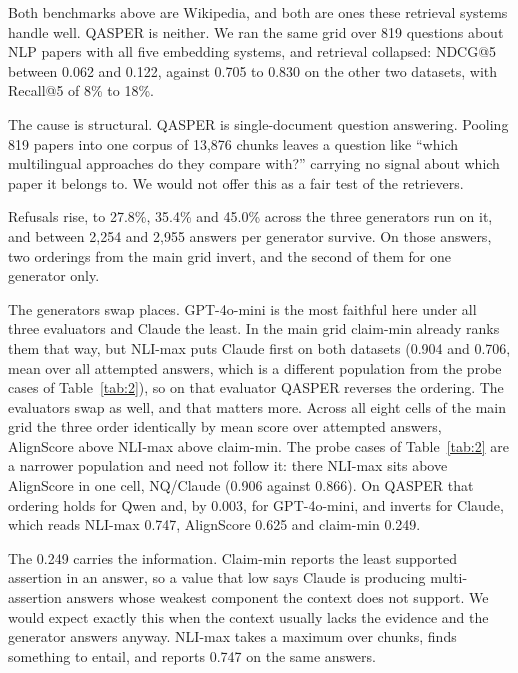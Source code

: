\label{sec:qasper}

Both benchmarks above are Wikipedia, and both are ones these retrieval systems handle well. QASPER \citep{dasigi-etal-2021} is neither. We ran the same grid over 819 questions about NLP papers with all five embedding systems, and retrieval collapsed: NDCG@5 between 0.062 and 0.122, against 0.705 to 0.830 on the other two datasets, with Recall@5 of 8\% to 18\%.

The cause is structural. QASPER is single-document question answering. Pooling 819 papers into one corpus of 13,876 chunks leaves a question like ``which multilingual approaches do they compare with?'' carrying no signal about which paper it belongs to. We would not offer this as a fair test of the retrievers.

Refusals rise, to 27.8\%, 35.4\% and 45.0\% across the three generators run on it, and between 2,254 and 2,955 answers per generator survive. On those answers, two orderings from the main grid invert, and the second of them for one generator only.

The generators swap places. GPT-4o-mini is the most faithful here under all three evaluators and Claude the least. In the main grid claim-min already ranks them that way, but NLI-max puts Claude first on both datasets (0.904 and 0.706, mean over all attempted answers, which is a different population from the probe cases of Table~\ref{tab:2}), so on that evaluator QASPER reverses the ordering. The evaluators swap as well, and that matters more. Across all eight cells of the main grid the three order identically by mean score over attempted answers, AlignScore above NLI-max above claim-min. The probe cases of Table~\ref{tab:2} are a narrower population and need not follow it: there NLI-max sits above AlignScore in one cell, NQ/Claude (0.906 against 0.866). On QASPER that ordering holds for Qwen and, by 0.003, for GPT-4o-mini, and inverts for Claude, which reads NLI-max 0.747, AlignScore 0.625 and claim-min 0.249.

The 0.249 carries the information. Claim-min reports the least supported assertion in an answer, so a value that low says Claude is producing multi-assertion answers whose weakest component the context does not support. We would expect exactly this when the context usually lacks the evidence and the generator answers anyway. NLI-max takes a maximum over chunks, finds something to entail, and reports 0.747 on the same answers.

